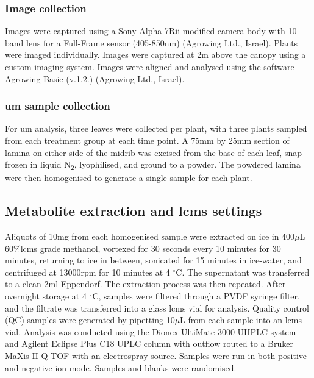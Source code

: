 \subsubsection{Image collection}
Images were captured using a Sony Alpha 7Rii modified camera body with 10 band lens for a Full-Frame sensor (405-850nm) (Agrowing Ltd., Israel). Plants were imaged individually. Images were captured at 2m above the canopy using a custom imaging system. Images were aligned and analysed using the software Agrowing Basic (v.1.2.) (Agrowing Ltd., Israel). 

\subsubsection{\Acl{um} sample collection}
For \ac{um} analysis, three leaves were collected per plant, with three plants sampled from each treatment group at each time point. A 75mm by 25mm section of lamina on either side of the midrib was excised from the base of each leaf, snap-frozen in liquid N\textsubscript{2}, lyophilised, and ground to a powder. The powdered lamina were then homogenised to generate a single  sample for each plant. 



\subsection{Metabolite extraction and \ac{lcms} settings}
Aliquots of 10mg from each homogenised sample were extracted on ice in 400\(\mu\)L 60\%\ac{lcms} grade methanol, vortexed for 30 seconds every 10 minutes for 30 minutes, returning to ice in between, sonicated for 15 minutes in ice-water, and centrifuged at 13000rpm for 10 minutes at 4 $^{\circ}$C. The supernatant was transferred to a clean 2ml Eppendorf. The extraction process was then repeated. After overnight storage at 4 $^{\circ}$C, samples were filtered through a PVDF syringe filter, and the filtrate was transferred into a glass \ac{lcms} vial for analysis. Quality control (QC) samples were generated by pipetting 10\(\mu\)L from each sample into an \ac{lcms} vial. Analysis was conducted using the Dionex UltiMate 3000 UHPLC system and Agilent Eclipse Plus C18 UPLC column with outflow routed to a Bruker MaXis II Q-TOF with an electrospray source. Samples were run in both positive and negative ion mode. Samples and blanks were randomised.

